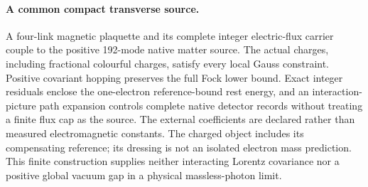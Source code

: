 \paragraph{A common compact transverse source.}
A four-link magnetic plaquette and its complete integer electric-flux
carrier couple to the positive 192-mode native matter source. The actual
charges, including fractional colourful charges, satisfy every local Gauss
constraint. Positive covariant hopping preserves the full Fock lower bound.
Exact integer residuals enclose the one-electron reference-bound rest energy,
and an interaction-picture path expansion controls complete native detector
records without treating a finite flux cap as the source. The external
coefficients are declared rather than measured electromagnetic constants.
The charged object includes its compensating reference; its dressing is
not an isolated electron mass prediction. This finite construction supplies
neither interacting Lorentz covariance nor a positive global vacuum gap in
a physical massless-photon limit.
